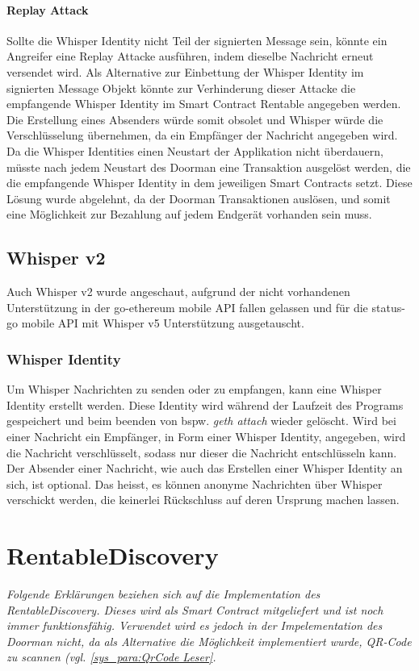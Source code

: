 \paragraph{Replay Attack}
Sollte die Whisper Identity nicht Teil der signierten Message sein, könnte ein Angreifer eine Replay Attacke ausführen, indem dieselbe Nachricht erneut versendet wird. Als Alternative zur Einbettung der Whisper Identity im signierten Message Objekt könnte zur Verhinderung dieser Attacke die empfangende Whisper Identity im Smart Contract Rentable angegeben werden. Die Erstellung eines Absenders würde somit obsolet und Whisper würde die Verschlüsselung übernehmen, da ein Empfänger der Nachricht angegeben wird. Da die Whisper Identities einen Neustart der Applikation nicht überdauern, müsste nach jedem Neustart des Doorman eine Transaktion ausgelöst werden, die die empfangende Whisper Identity in dem jeweiligen Smart Contracts setzt. Diese Lösung wurde abgelehnt, da der Doorman Transaktionen auslösen, und somit eine Möglichkeit zur Bezahlung auf jedem Endgerät vorhanden sein muss.

\subsection{Whisper v2}
Auch Whisper v2 wurde angeschaut, aufgrund der nicht vorhandenen Unterstützung in der go-ethereum mobile API fallen gelassen und für die status-go mobile API mit Whisper v5 Unterstützung ausgetauscht.

\subsubsection{Whisper Identity}
\label{old_subpara:Whisper_Identity}
Um Whisper Nachrichten zu senden oder zu empfangen, kann eine Whisper Identity erstellt werden. Diese Identity wird während der Laufzeit des Programs gespeichert und beim beenden von bspw. \emph{geth attach} wieder gelöscht. Wird bei einer Nachricht ein Empfänger, in Form einer Whisper Identity, angegeben, wird die Nachricht verschlüsselt, sodass nur dieser die Nachricht entschlüsseln kann. Der Absender einer Nachricht, wie auch das Erstellen einer Whisper Identity an sich, ist optional. Das heisst, es können anonyme Nachrichten über Whisper verschickt werden, die keinerlei Rückschluss auf deren Ursprung machen lassen. \cite[web3.shh/post]{web3js.readthedocs.io}


\section{RentableDiscovery}
\emph{Folgende Erklärungen beziehen sich auf die Implementation des RentableDiscovery. Dieses wird als Smart Contract mitgeliefert und ist noch immer funktionsfähig. Verwendet wird es jedoch in der Impelementation des Doorman nicht, da als Alternative die Möglichkeit implementiert wurde, QR-Code zu scannen (vgl. \ref{sys_para:QrCode Leser}.}


